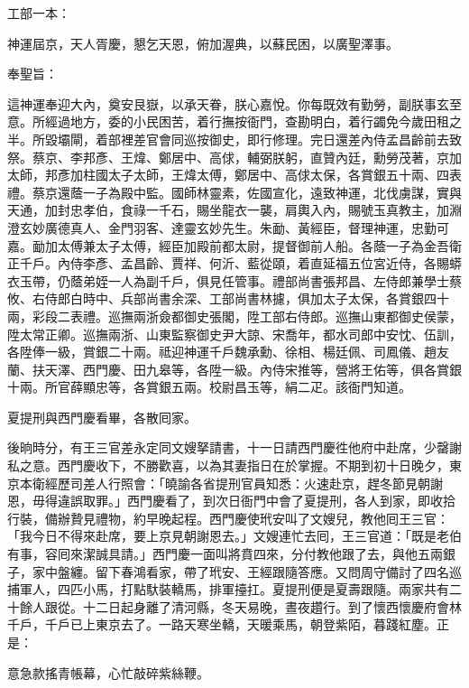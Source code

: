 \begin{myquote}[\markfont]
工部一本：

神運屆京，天人胥慶，懇乞天恩，俯加渥典，以蘇民困，以廣聖澤事。

奉聖旨：

這神運奉迎大內，奠安艮嶽，以承天眷，朕心嘉悅。你每既效有勤勞，副朕事玄至意。所經過地方，委的小民困苦，着行撫按衙門，查勘明白，着行蠲免今歲田租之半。所毀壩閘，着部裡差官會同巡按御史，即行修理。完日還差內侍孟昌齡前去致祭。蔡京、李邦彥、王煒、鄭居中、高俅，輔弼朕躬，直贊內廷，勳勞茂著，京加太師，邦彥加柱國太子太師，王煒太傅，鄭居中、高俅太保，各賞銀五十兩、四表禮。蔡京還蔭一子為殿中監。國師林靈素，佐國宣化，遠致神運，北伐虜謀，實與天通，加封忠孝伯，食祿一千石，賜坐龍衣一襲，肩輿入內，賜號玉真教主，加淵澄玄妙廣德真人、金門羽客、達靈玄妙先生。{}朱勔、黃經臣，督理神運，忠勤可嘉。勔加太傅兼太子太傅，經臣加殿前都太尉，提督御前人船。各蔭一子為金吾衛正千戶。內侍李彥、孟昌齡、賈祥、何沂、藍從頤，着直延福五位宮近侍，各賜蟒衣玉帶，仍蔭弟姪一人為副千戶，俱見任管事。禮部尚書張邦昌、左侍郎兼學士蔡攸、右侍郎白時中、兵部尚書余深、工部尚書林攄，俱加太子太保，各賞銀四十兩，彩段二表禮。巡撫兩浙僉都御史張閣，陞工部右侍郎。巡撫山東都御史侯蒙，陞太常正卿。巡撫兩浙、山東監察御史尹大諒、宋喬年，都水司郎中安忱、伍訓，各陞俸一級，賞銀二十兩。祗迎神運千戶魏承勳、徐相、楊廷佩、司鳳儀、趙友蘭、扶天澤、西門慶、田九皋等，各陞一級。內侍宋推等，營將王佑等，俱各賞銀十兩。所官薛顯忠等，各賞銀五兩。校尉昌玉等，絹二疋。該衙門知道。
\end{myquote} 

夏提刑與西門慶看畢，各散囘家。

後晌時分，有王三官差永定同文嫂拏請書，十一日請西門慶徃他府中赴席，少罄謝私之意。西門慶收下，不勝歡喜，以為其妻指日在於掌握。{}不期到初十日晚夕，東京本衛經歷司差人行照會：「曉諭各省提刑官員知悉：火速赴京，趕冬節見朝謝恩，毋得違誤取罪。」西門慶看了，到次日衙門中會了夏提刑，各人到家，即收拾行裝，備辦贄見禮物，約早晚起程。西門慶使玳安叫了文嫂兒，教他囘王三官：「我今日不得來赴席，要上京見朝謝恩去。」文嫂連忙去囘，王三官道：「既是老伯有事，容囘來潔誠具請。」西門慶一面叫將賁四來，分付教他跟了去，與他五兩銀子，家中盤纏。留下春鴻看家，帶了玳安、王經跟隨答應。又問周守備討了四名巡捕軍人，四匹小馬，打點馱裝轎馬，排軍擡扛。夏提刑便是夏壽跟隨。兩家共有二十餘人跟從。十二日起身離了清河縣，冬天易晚，晝夜趲行。到了懷西懷慶府會林千戶，千戶已上東京去了。一路天寒坐轎，天暖乘馬，朝登紫陌，暮踐紅塵。正是：

\begin{myquote}
意急款搖青帳幕，心忙敲碎紫絲鞭。
\end{myquote}

